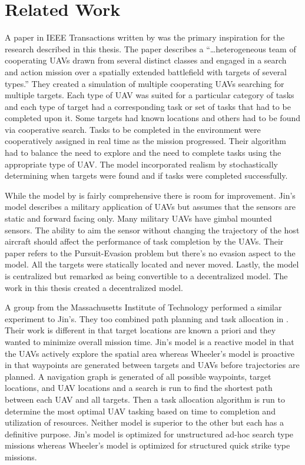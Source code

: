\chapter{Related Work}

A paper in IEEE Transactions written by \cite{jin} was the primary inspiration for the research described in this thesis.  The paper describes a ``\ldots heterogeneous team of cooperating UAVs drawn from several distinct classes and engaged in a search and action mission over a spatially extended battlefield with targets of several types.'' They created a simulation of multiple cooperating UAVs searching for multiple targets.  Each type of UAV was suited for a particular category of tasks and each type of target had a corresponding task or set of tasks that had to be completed upon it.  Some targets had known locations and others had to be found via cooperative search.  Tasks to be completed in the environment were cooperatively assigned in real time as the mission progressed.  Their algorithm had to balance the need to explore and the need to complete tasks using the appropriate type of UAV.  The model incorporated realism by stochastically determining when targets were found and if tasks were completed successfully.

While the model by \cite{jin} is fairly comprehensive there is room for improvement.  Jin’s model describes a military application of UAVs but assumes that the sensors are static and forward facing only.  Many military UAVs have gimbal mounted sensors.  The ability to aim the sensor without changing the trajectory of the host aircraft should affect the performance of task completion by the UAVs.  Their paper refers to the Pursuit-Evasion problem but there’s no evasion aspect to the model.  All the targets were statically located and never moved.  Lastly, the model is centralized but remarked as being convertible to a decentralized model.  The work in this thesis created a decentralized model.

A group from the Massachusetts Institute of Technology performed a similar experiment to Jin’s.   They too combined path planning and task allocation in \cite{bellingham}.  Their work is different in that target locations are known a priori and they wanted to minimize overall mission time.  Jin’s model is a reactive model in that the UAVs actively explore the spatial area whereas Wheeler’s model is proactive in that waypoints are generated between targets and UAVs before trajectories are planned.  A navigation graph is generated of all possible waypoints, target locations, and UAV locations and a search is run to find the shortest path between each UAV and all targets.  Then a task allocation algorithm is run to determine the most optimal UAV tasking based on time to completion and utilization of resources.  Neither model is superior to the other but each has a definitive purpose.  Jin’s model is optimized for unstructured ad-hoc search type missions whereas Wheeler’s model is optimized for structured quick strike type missions.

